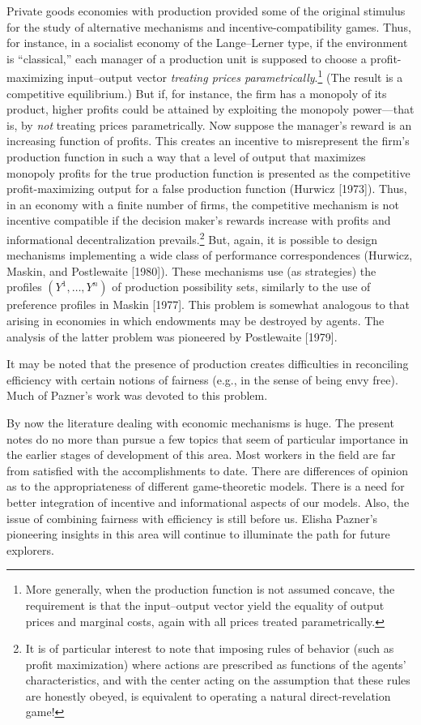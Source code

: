 \documentclass[12pt, letterpaper]{article}
\begin{document}
Private goods economies with production provided some of the original stimulus for the study of alternative mechanisms and incentive-compatibility games. Thus, for instance, in a socialist economy of the Lange--Lerner type, if the environment is ``classical,'' each manager of a production unit is supposed to choose a profit-maximizing input–output vector \textit{treating prices parametrically}.\footnote{More generally, when the production function is not assumed concave, the requirement is that the input–output vector yield the equality of output prices and marginal costs, again with all prices treated parametrically.} (The result is a competitive equilibrium.) But if, for instance, the firm has a monopoly of its product, higher profits could be attained by exploiting the monopoly power---that is, by \textit{not} treating prices parametrically. Now suppose the manager's reward is an increasing function of profits. This creates an incentive to misrepresent the firm's production function in such a way that a level of output that maximizes monopoly profits for the true production function is presented as the competitive profit-maximizing output for a false production function (Hurwicz [1973]). Thus, in an economy with a finite number of firms, the competitive mechanism is not incentive compatible if the decision maker's rewards increase with profits and informational decentralization prevails.\footnote{It is of particular interest to note that imposing rules of behavior (such as profit maximization) where actions are prescribed as functions of the agents' characteristics, and with the center acting on the assumption that these rules are honestly obeyed, is equivalent to operating a natural direct-revelation game!} But, again, it is possible to design mechanisms implementing a wide class of performance correspondences (Hurwicz, Maskin, and Postlewaite [1980]). These mechanisms use (as strategies) the profiles $(Y^1, \dots, Y^n)$ of production possibility sets, similarly to the use of preference profiles in Maskin [1977]. This problem is somewhat analogous to that arising in economies in which endowments may be destroyed by agents. The analysis of the latter problem was pioneered by Postlewaite [1979].

It may be noted that the presence of production creates difficulties in reconciling efficiency with certain notions of fairness (e.g., in the sense of being envy free). Much of Pazner's work was devoted to this problem.

\medskip

By now the literature dealing with economic mechanisms is huge. The present notes do no more than pursue a few topics that seem of particular importance in the earlier stages of development of this area. Most workers in the field are far from satisfied with the accomplishments to date. There are differences of opinion as to the appropriateness of different game-theoretic models. There is a need for better integration of incentive and informational aspects of our models. Also, the issue of combining fairness with efficiency is still before us. Elisha Pazner's pioneering insights in this area will continue to illuminate the path for future explorers.
\end{document}
